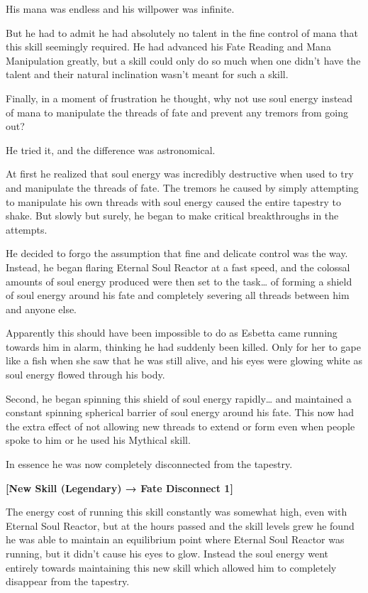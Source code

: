 \documentclass[a4paper,10pt]{book}
\begin{document}
His mana was endless and his willpower was infinite.\par
But he had to admit he had absolutely no talent in the fine control of mana that this skill seemingly required. He had advanced his Fate Reading and Mana Manipulation greatly, but a skill could only do so much when one didn’t have the talent and their natural inclination wasn’t meant for such a skill.\par
Finally, in a moment of frustration he thought, why not use soul energy instead of mana to manipulate the threads of fate and prevent any tremors from going out?\par
He tried it, and the difference was astronomical.\par
At first he realized that soul energy was incredibly destructive when used to try and manipulate the threads of fate. The tremors he caused by simply attempting to manipulate his own threads with soul energy caused the entire tapestry to shake. But slowly but surely, he began to make critical breakthroughs in the attempts.\par
He decided to forgo the assumption that fine and delicate control was the way. Instead, he began flaring Eternal Soul Reactor at a fast speed, and the colossal amounts of soul energy produced were then set to the task… of forming a shield of soul energy around his fate and completely severing all threads between him and anyone else.\par
Apparently this should have been impossible to do as Esbetta came running towards him in alarm, thinking he had suddenly been killed. Only for her to gape like a fish when she saw that he was still alive, and his eyes were glowing white as soul energy flowed through his body.\par
Second, he began spinning this shield of soul energy rapidly… and maintained a constant spinning spherical barrier of soul energy around his fate. This now had the extra effect of not allowing new threads to extend or form even when people spoke to him or he used his Mythical skill.\par
In essence he was now completely disconnected from the tapestry.\par
\textbf{[New Skill (Legendary) → Fate Disconnect 1]}\par
The energy cost of running this skill constantly was somewhat high, even with Eternal Soul Reactor, but at the hours passed and the skill levels grew he found he was able to maintain an equilibrium point where Eternal Soul Reactor was running, but it didn’t cause his eyes to glow. Instead the soul energy went entirely towards maintaining this new skill which allowed him to completely disappear from the tapestry.\par
\end{document}
